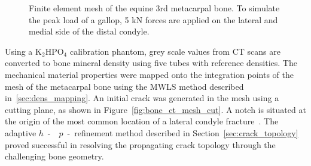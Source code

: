 \documentclass[onecolumn]{svjour3}
\begin{document}
% 
% 
\begin{figure}[h]
	\begin{center}
		\caption{Finite element mesh of the equine 3rd metacarpal bone. To simulate the peak load of a gallop, 5 kN forces are applied on the lateral and medial side of the distal condyle.}
		\label{fig:mc3_BC}
	\end{center}
\end{figure}
% 
% 
Using a $\mathrm {K_2 HPO_4}$ calibration phantom, grey scale values from CT scans are converted to bone mineral density 
using five tubes with reference densities. 
The mechanical material properties were mapped onto the integration points of the mesh of the metacarpal bone using the MWLS method described in~\ref{sec:dens_mapping}. 
% 
An initial crack was generated in the mesh using a cutting plane, as shown in Figure~\ref{fig:bone_ct_mesh_cut}. A notch is situated at the origin of the most common location of a lateral condyle fracture~\cite{jacklin2012frequency}. The adaptive $h$~-~~$p$~-~refinement method described in Section~\ref{sec:crack_topology} proved successful in resolving the propagating crack topology through the challenging bone geometry.
\end{document}
